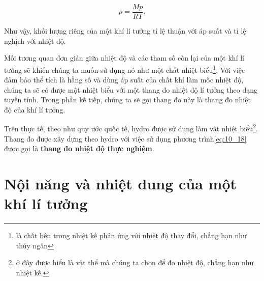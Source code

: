 \begin{equation}\label{eq:10_22}
	\rho = \frac{M p}{R T}.
\end{equation}

\noindent

Như vậy, khối lượng riêng của một khí lí tưởng tỉ lệ thuận với áp suất và tỉ lệ nghịch với nhiệt độ.


Mối tương quan đơn giản giữa nhiệt độ và các tham số còn lại của một khí lí tưởng sẽ khiến chúng ta muốn sử dụng nó như một chất nhiệt biểu\footnote{là chất bên trong nhiệt kế phản ứng với nhiệt độ thay đổi, chẳng hạn như thủy ngân}. Với việc đảm bảo thể tích là hằng số và dùng áp suất của chất khí làm mốc nhiệt độ, chúng ta sẽ có được một nhiệt biểu với một thang đo nhiệt độ lí tưởng theo dạng tuyến tính. Trong phần kế tiếp, chúng ta sẽ gọi thang đo này là thang đo nhiệt độ của khí lí tưởng.


Trên thực tế, theo như quy ước quốc tế, hydro được sử dụng làm vật nhiệt biểu\footnote{ở đây được hiểu là vật thể mà chúng ta chọn để đo nhiệt độ, chẳng hạn như nhiệt kế.}. Thang đo được xây dựng theo hydro với việc sử dụng phương trình\eqref{eq:10_18} được gọi là \textbf{thang đo nhiệt độ thực nghiệm}.


\section{Nội năng và nhiệt dung của một khí lí tưởng}\label{sec:10_9}


